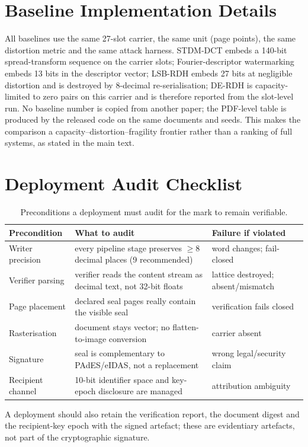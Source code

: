 \documentclass[journal]{IEEEtran}
\begin{document}
\section{Baseline Implementation Details}
All baselines use the same 27-slot carrier, the same unit (page points), the same distortion metric and the same attack harness. STDM-DCT embeds a 140-bit spread-transform sequence on the carrier slots; Fourier-descriptor watermarking embeds 13 bits in the descriptor vector; LSB-RDH embeds 27 bits at negligible distortion and is destroyed by 8-decimal re-serialisation; DE-RDH is capacity-limited to zero pairs on this carrier and is therefore reported from the slot-level run. No baseline number is copied from another paper; the PDF-level table is produced by the released code on the same documents and seeds. This makes the comparison a capacity--distortion--fragility frontier rather than a ranking of full systems, as stated in the main text.

\section{Deployment Audit Checklist}
\begin{table}[t]
\centering
\footnotesize
\caption{Preconditions a deployment must audit for the mark to remain verifiable.}
\label{tab:deploy}
\begin{tabular}{@{}p{2.2cm}p{3.0cm}p{2.3cm}@{}}
\toprule
Precondition & What to audit & Failure if violated \\
\midrule
Writer precision & every pipeline stage preserves $\ge 8$ decimal places (9 recommended) & word changes; fail-closed \\
Verifier parsing & verifier reads the content stream as decimal text, not 32-bit floats & lattice destroyed; absent/mismatch \\
Page placement & declared seal pages really contain the visible seal & verification fails closed \\
Rasterisation & document stays vector; no flatten-to-image conversion & carrier absent \\
Signature & seal is complementary to PAdES/eIDAS, not a replacement & wrong legal/security claim \\
Recipient channel & 10-bit identifier space and key-epoch disclosure are managed & attribution ambiguity \\
\bottomrule
\end{tabular}
\end{table}
A deployment should also retain the verification report, the document digest and the recipient-key epoch with the signed artefact; these are evidentiary artefacts, not part of the cryptographic signature.



\end{document}
